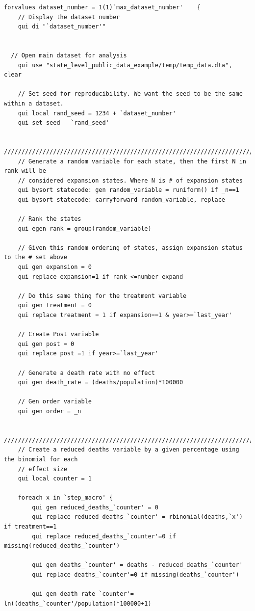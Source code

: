 \documentclass[12pt]{article}%
\begin{document}
\begin{appendices}
\begin{footnotesize}
\begin{verbatim}
forvalues dataset_number = 1(1)`max_dataset_number'    {
    // Display the dataset number
    qui di "`dataset_number'"
        

  // Open main dataset for analysis
    qui use "state_level_public_data_example/temp/temp_data.dta", clear

    // Set seed for reproducibility. We want the seed to be the same within a dataset. 
    qui local rand_seed = 1234 + `dataset_number'
    qui set seed   `rand_seed'

    ///////////////////////////////////////////////////////////////////////////////            
    // Generate a random variable for each state, then the first N in rank will be 
    // considered expansion states. Where N is # of expansion states
    qui bysort statecode: gen random_variable = runiform() if _n==1
    qui bysort statecode: carryforward random_variable, replace

    // Rank the states
    qui egen rank = group(random_variable)

    // Given this random ordering of states, assign expansion status to the # set above
    qui gen expansion = 0 
    qui replace expansion=1 if rank <=number_expand

    // Do this same thing for the treatment variable
    qui gen treatment = 0 
    qui replace treatment = 1 if expansion==1 & year>=`last_year' 

    // Create Post variable
    qui gen post = 0
    qui replace post =1 if year>=`last_year'             

    // Generate a death rate with no effect
    qui gen death_rate = (deaths/population)*100000

    // Gen order variable 
    qui gen order = _n

    /////////////////////////////////////////////////////////////////////////////
    // Create a reduced deaths variable by a given percentage using the binomial for each 
    // effect size
    qui local counter = 1

    foreach x in `step_macro' {
        qui gen reduced_deaths_`counter' = 0 
        qui replace reduced_deaths_`counter' = rbinomial(deaths,`x') if treatment==1
        qui replace reduced_deaths_`counter'=0 if missing(reduced_deaths_`counter')

        qui gen deaths_`counter' = deaths - reduced_deaths_`counter'
        qui replace deaths_`counter'=0 if missing(deaths_`counter')

        qui gen death_rate_`counter'= ln((deaths_`counter'/population)*100000+1)


\end{verbatim}
\end{footnotesize}
\end{appendices}
\end{document}
